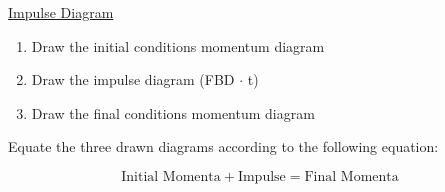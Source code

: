 \documentclass[twocolumn, 12pt]{article}
\begin{document}
\vspace{10pt}
\noindent
\underline{Impulse Diagram}
\begin{enumerate}
    \item Draw the initial conditions momentum diagram
    \item Draw the impulse diagram (FBD \(\cdot\) t)
    \item Draw the final conditions momentum diagram
\end{enumerate}
\noindent
Equate the three drawn diagrams according to the following equation:

\begin{equation*}
     \text{Initial Momenta} + \text{Impulse}=\text{Final Momenta}
\end{equation*}
\end{document}
